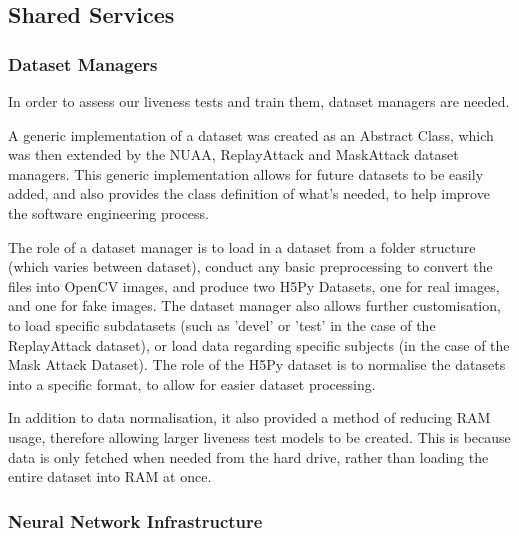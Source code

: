 \documentclass[10pt,a4paper]{article}
\begin{document}

    \subsection{Shared Services}
        \subsubsection{Dataset Managers}
        In order to assess our liveness tests and train them, dataset managers are needed.

        A generic implementation of a dataset was created as an Abstract Class, which was then extended by the NUAA, ReplayAttack and MaskAttack dataset managers.
        This generic implementation allows for future datasets to be easily added, and also provides the class definition of what's needed, to help improve the software engineering process.

        The role of a dataset manager is to load in a dataset from a folder structure (which varies between dataset), conduct any basic preprocessing to convert the files into OpenCV images,
        and produce two H5Py Datasets, one for real images, and one for fake images. The dataset manager also allows further customisation, to load specific subdatasets (such as 'devel' or 'test' in the case
        of the ReplayAttack dataset), or load data regarding specific subjects (in the case of the Mask Attack Dataset). The role of the H5Py dataset is to normalise the datasets into a specific format,
        to allow for easier dataset processing.

        In addition to data normalisation, it also provided a method of reducing RAM usage, therefore allowing larger liveness test models to be created. This is because data is only fetched when needed
        from the hard drive, rather than loading the entire dataset into RAM at once.


        \subsubsection{Neural Network Infrastructure}
            
\end{document}

